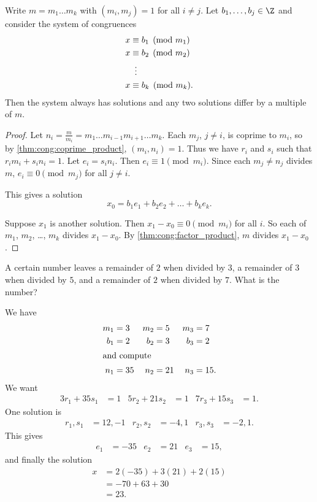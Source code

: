 \begin{theorem} \label{thm:congruences:chinese}
    Write $m = m_1 \dots m_k$ with $(m_i, m_j) = 1$ for all $i \ne j$.
    Let $b_1, \dots, b_j \in \Z$ and consider the system of congruences
    \begin{align*}
        x &\equiv b_1 \pmod{m_1} \\
        x &\equiv b_2 \pmod{m_2} \\
        &\mathrel{\makebox[\widthof{$\equiv$}]{\vdots}} \\
        x &\equiv b_k \pmod{m_k}.
    \end{align*}
    Then the system always has solutions and any two solutions differ by a
    multiple of $m$.
\end{theorem}
\begin{proof}
    Let $n_i = \frac{m}{m_i} = m_1 \dots m_{i-1} m_{i+1} \dots m_k$.
    Each $m_j$, $j \ne i$, is coprime to $m_i$, so
    by \cref{thm:cong:coprime_product}, $(m_i, n_i) = 1$.
    Thus we have $r_i$ and $s_i$ such that $r_i m_i + s_i n_i = 1$.
    Let $e_i = s_i n_i$.
    Then $e_i \equiv 1 \pmod{m_i}$.
    Since each $m_j \ne n_j$ divides $m$,
    $e_i \equiv 0 \pmod{m_j}$ for all $j \ne i$.

    This gives a solution \[
        x_0 = b_1 e_1 + b_2 e_2 + \dots + b_k e_k.
    \]

    Suppose $x_1$ is another solution.
    Then $x_1 - x_0 \equiv 0 \pmod{m_i}$ for all $i$.
    So each of $m_1$, $m_2$, \dots, $m_k$ divides $x_1 - x_0$.
    By \cref{thm:cong:factor_product}, $m$ divides $x_1 - x_0$.
\end{proof}
\begin{example}
    A certain number leaves a remainder of $2$ when divided by $3$,
    a remainder of $3$ when divided by $5$, and a remainder of $2$
    when divided by $7$. What is the number?

    We have \begin{align*}
        m_1 &= 3 & m_2 &= 5 & m_3 &= 7 \\
        b_1 &= 2 & b_2 &= 3 & b_3 &= 2 \\
        \shortintertext{and compute}
        n_1 &= 35 & n_2 &= 21 & n_3 &= 15.
    \end{align*}
    We want \begin{align*}
        3 r_1 + 35 s_1 &= 1 & 5 r_2 + 21 s_2 &= 1 & 7 r_3 + 15 s_3 &= 1.
    \end{align*}
    One solution is \begin{align*}
        r_1, s_1 &= 12, -1 & r_2, s_2 &= -4, 1 & r_3, s_3 &= -2, 1.
    \end{align*}
    This gives \begin{align*}
        e_1 &= -35 & e_2 &= 21 & e_3 &= 15,
    \end{align*}
    and finally the solution \begin{align*}
        x &= 2 (-35) + 3 (21) + 2 (15) \\
        &= -70 + 63 + 30 \\
        &= 23.
    \end{align*}
\end{example}
